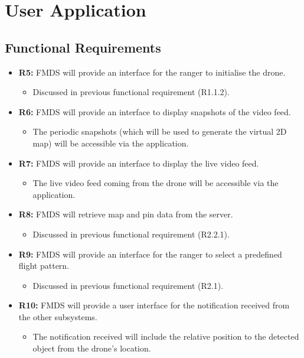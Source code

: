 \section{User Application}

\subsection{Functional Requirements}

	\begin{flushleft}
		\begin{itemize}
			\item{\textbf{R5:}} FMDS will provide an interface for the ranger to initialise the drone.
				\begin{itemize}
					\item Discussed in previous functional requirement (R1.1.2).
				\end{itemize} 
			\item{\textbf{R6:}} FMDS will provide an interface to display snapshots of the video feed.
				\begin{itemize}
					\item The periodic snapshots (which will be used to generate the virtual 2D map) will be accessible via the application.
				\end{itemize} 
			\item{\textbf{R7:}} FMDS will provide an interface to display the live video feed.
				\begin{itemize}
					\item The live video feed coming from the drone will be accessible via the application.
				\end{itemize} 
			\item{\textbf{R8:}} FMDS will retrieve map and pin data from the server.
				\begin{itemize}
					\item Discussed in previous functional requirement (R2.2.1).
				\end{itemize} 
			\item{\textbf{R9:}} FMDS will provide an interface for the ranger to select a predefined flight pattern.
				\begin{itemize}
					\item Discussed in previous functional requirement (R2.1).
				\end{itemize} 
			\item{\textbf{R10:}} FMDS will provide a user interface for the notification received from the other subsystems.
				\begin{itemize}
					\item The notification received will include the relative position to the detected object from the drone's location.
				\end{itemize} 
		\end{itemize}

	\end{flushleft}

